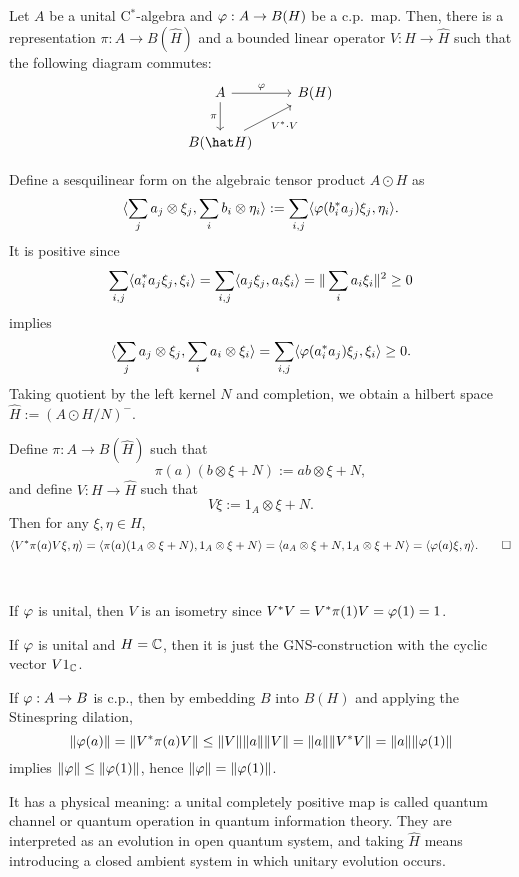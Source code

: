\documentclass{../../../small}
\begin{document}
\begin{thm}
Let $A$ be a unital C$^*$-algebra and $\varphi:A\to B(H)$ be a c.p.~map.
Then, there is a representation $\pi:A\to B(\hat H)$ and a bounded linear operator $V:H\to\hat H$ such that the following diagram commutes:
\[\begin{tikzcd}
 A \ar{r}{\f} \ar[swap]{d}{\pi} & B(H) \\
B(\hat H) \ar[swap]{ur}{V^*\cdot V} &
\end{tikzcd}\]
\end{thm}
\begin{pf}
Define a sesquilinear form on the algebraic tensor product $A\odot H$ as
\[\langle\sum_ja_j\otimes\xi_j,\sum_ib_i\otimes\eta_i\rangle:=\sum_{i,j}\langle\varphi(b_i^*a_j)\xi_j,\eta_i\rangle.\]
It is positive since
\[\sum_{i,j}\langle a_i^*a_j\xi_j,\xi_i\rangle=\sum_{i,j}\langle a_j\xi_j,a_i\xi_i\rangle=\|\sum_ia_i\xi_i\|^2\ge0\]
implies
\[\langle\sum_ja_j\otimes\xi_j,\sum_ia_i\otimes\xi_i\rangle=\sum_{i,j}\langle\varphi(a_i^*a_j)\xi_j,\xi_i\rangle\ge0.\]
Taking quotient by the left kernel $N$ and completion, we obtain a hilbert space $\hat H:=(A\odot H/N)^-$.

Define $\pi:A\to B(\hat H)$ such that
\[\pi(a)(b\otimes\xi+N):=ab\otimes\xi+N,\]
and define $V:H\to\hat H$ such that
\[V\xi:=1_ A\otimes\xi+N.\]
Then for any $\xi,\eta\in H$,
\[\langle V^*\pi(a)V\xi,\eta\rangle=\langle\pi(a)(1_ A\otimes\xi+N),1_ A\otimes\xi+N\rangle=\langle a_ A\otimes\xi+N,1_ A\otimes\xi+N\rangle=\langle\varphi(a)\xi,\eta\rangle.\qedhere\]
\end{pf}

\begin{rmk}\,
\begin{parts}
\item If $\varphi$ is unital, then $V$ is an isometry since $V^*V=V^*\pi(1)V=\varphi(1)=1$.
\item If $\varphi$ is unital and $H=\mathbb{C}$, then it is just the GNS-construction with the cyclic vector $V1_{\mathbb{C}}$.
\item If $\varphi:A\to B$ is c.p., then by embedding $B$ into $B(H)$ and applying the Stinespring dilation,
\[\|\varphi(a)\|=\|V^*\pi(a)V\|\le\|V\|\|a\|\|V\|=\|a\|\|V^*V\|=\|a\|\|\varphi(1)\|\]
implies $\|\varphi\|\le\|\varphi(1)\|$, hence $\|\varphi\|=\|\varphi(1)\|$.
\item It has a physical meaning: a unital completely positive map is called quantum channel or quantum operation in quantum information theory. They are interpreted as an evolution in open quantum system, and taking $\hat H$ means introducing a closed ambient system in which unitary evolution occurs.
\end{parts}
\end{rmk}
\end{document}

